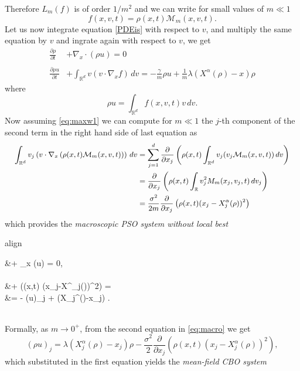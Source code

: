 \documentclass{ims9x6}
\newcommand{\coloredeq}[2]{\begin{empheq}[box={\mymath[colback=gray!13, sharp corners]}]{align}\label{#1}#2\end{empheq}}
\newcommand{\nn}{\nonumber}
\newcommand{\RR}{\mathbb{R}}
\begin{document}
Therefore $L_{m}(f)$ is of order $1/m^2 $ and we can write for small values of $m \ll 1$
\begin{equation}
f(x,v,t)=\rho(x,t){\mathcal M}_m(x,v,t).
\label{eq:maxw1}
\end{equation}
{Let us now integrate equation \eqref{PDEis} with respect to $v$, and multiply the same equation by $v$ and ingrate again with respect to $v$,
we get}
\[
\begin{split}
\frac{\partial \rho}{\partial t} &+ \nabla_x \cdot (\rho u) = 0\\
\\[-.5cm] \nn
\frac{\partial \rho u}{\partial t} &+ \int_{\RR^d} v\left(v\cdot \nabla_x f\right)\,dv = -\frac{\gamma}{m} \rho u + \frac1{m} \lambda (X^{\alpha}(\rho)-x) \rho
\end{split}
\]
where
\[
\rho u = \int_{\RR^d} f(x,v,t) v\,dv.
\]
{Now assuming \eqref{eq:maxw1} we can compute for
$m \ll 1$ the $j$-th component of the second term in the right hand side of
last equation as}
\[{\small
\begin{split}
\int_{\RR^d} v_j\left(v\cdot \nabla_x \left(\rho(x,t){\mathcal M}_m(x,v,t)\right) \right)\,dv &=  \sum_{j=1}^d \frac{\partial}{\partial x_j} \left(\rho(x,t) \int_{\RR^d} v_j (v_j {\mathcal M}_m(x,v,t))\,dv\right)\\
&=  \frac{\partial}{\partial x_j} \left(\rho(x,t) \int_{\RR} v^2_j {M}_m(x_j,v_j,t)\,dv_j\right)\\
&= \frac{\sigma^2}{2m}\frac{\partial}{\partial x_j} \left(\rho(x,t) (x_j-X^\alpha_j(\rho))^2\right)
\end{split}}
\]
which provides the \emph{macroscopic PSO system without local best}
\coloredeq{eq:macro}{
\begin{split}
\frac{\partial \rho}{\partial t} &+ \nabla_x \cdot (\rho u) = 0,\\
\\[-.5cm]
\frac{\partial (\rho u)_j}{\partial t} &+ \frac{\sigma^2}{2m} \frac{\partial}{\partial x_j} \left(\rho(x,t) (x_j-X^\alpha_j(\rho))^2\right) =\\
&= \displaystyle -\frac{1-m}{m} (\rho u)_j + \frac1{m} \lambda (X_j^{\alpha}(\rho)-x_j) \rho.
\end{split}}
\\
Formally, as $m\to 0^+$, from the second equation in \eqref{eq:macro} we get 
\[
(\rho u)_j = \lambda (X_j^{\alpha}(\rho)-x_j) \rho -\frac{\sigma^2}{2} \frac{\partial}{\partial x_j} \left(\rho(x,t) (x_j-X^\alpha_j(\rho))^2\right),
\]
which substituted in the first equation yields the \emph{mean-field CBO system} \cite{carrillo2019consensus}
\end{document}
